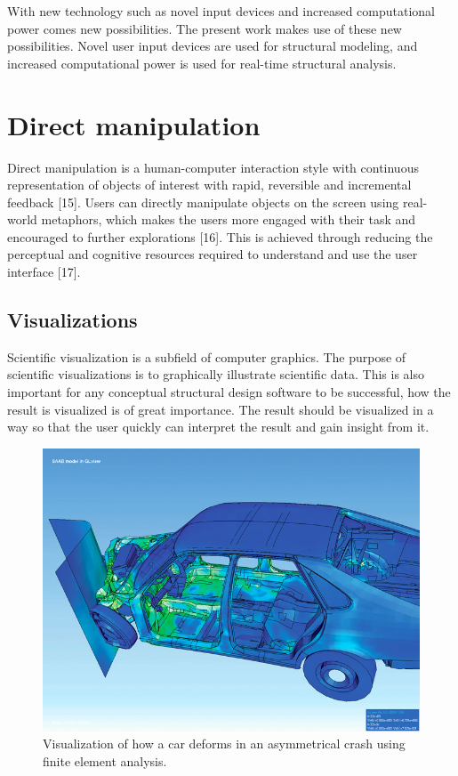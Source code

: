 With new technology such as novel input devices and increased computational power comes new possibilities. The present work makes use of these new possibilities. Novel user input devices are used for structural modeling, and increased computational power is used for real-time structural analysis. 

\section{Direct manipulation}
Direct manipulation is a human-computer interaction style with continuous representation of objects of interest with rapid, reversible and incremental feedback [15]. Users can directly manipulate objects on the screen using real-world metaphors, which makes the users more engaged with their task and encouraged to further explorations [16]. This is achieved through reducing the perceptual and cognitive resources required to understand and use the user interface [17].

\subsection{Visualizations}
Scientific visualization is a subfield of computer graphics. The purpose of scientific visualizations is to graphically illustrate scientific data. This is also important for any conceptual structural design software to be successful, how the result is visualized is of great importance. The result should be visualized in a way so that the user quickly can interpret the result and gain insight from it. 

\begin{figure}
  \includegraphics[width=350pt]{graphics/car.jpg}
  \caption{Visualization of how a car deforms in an asymmetrical crash using finite element analysis.}
  \label{fig:Car}
\end{figure}

